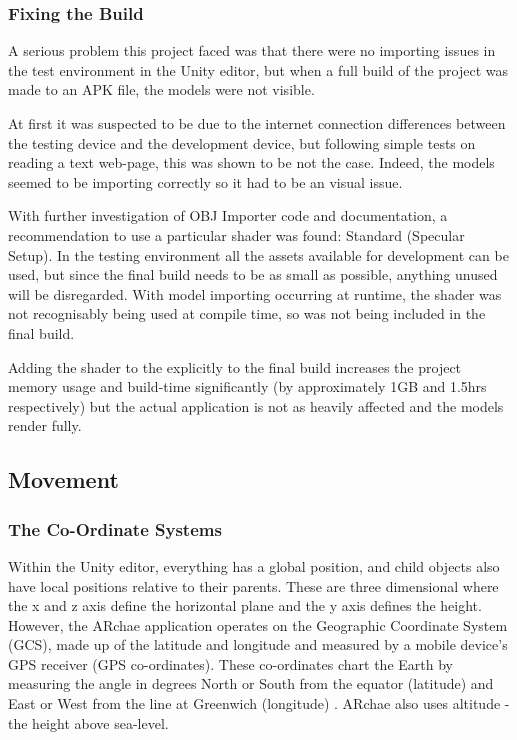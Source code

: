 \documentclass[12pt, a4paper]{article}
\begin{document}
\subsubsection{Fixing the Build}
A serious problem this project faced was that there were no importing issues in the test environment in the Unity editor, but when a full build of the project was made to an APK file, the models were not visible. 

At first it was suspected to be due to the internet connection differences between the testing device and the development device, but following simple tests on reading a text web-page, this was shown to be not the case. Indeed, the models seemed to be importing correctly so it had to be an visual issue. 

With further investigation of OBJ Importer code and documentation, a recommendation to use a particular shader was found: Standard (Specular Setup). In the testing environment all the assets available for development can be used, but since the final build needs to be as small as possible, anything unused will be disregarded. With model importing occurring at runtime, the shader was not recognisably being used at compile time, so was not being included in the final build.

Adding the shader to the explicitly to the final build increases the project memory usage and build-time significantly (by approximately 1GB and 1.5hrs respectively) but the actual application is not as heavily affected and the models render fully.

\subsection{Movement}
\label{movement}

\subsubsection{The Co-Ordinate Systems}
Within the Unity editor, everything has a global position, and child objects also have local positions relative to their parents. These are three dimensional where the x and z axis define the horizontal plane and the y axis defines the height. However, the ARchae application operates on the Geographic Coordinate System (GCS), made up of the latitude and longitude and measured by a mobile device's GPS receiver (GPS co-ordinates). These co-ordinates chart the Earth by measuring the angle in degrees North or South from the equator (latitude) and East or West from the line at Greenwich (longitude) \cite{movement:latitudelongitude}. ARchae also uses altitude - the height above sea-level.
\end{document}
